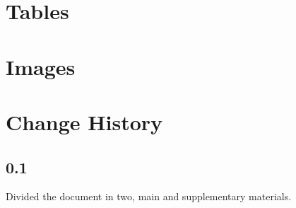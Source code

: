 \documentclass[10pt, a4paper, onecolumn]{article} %
\begin{document}
\listoffigures
\listoftables
\newpage


%

\section{Tables}














%

\section{Images}




\newpage

\section{Change History}

\subsection*{0.1}

Divided the document in two, main and supplementary materials.
\end{document}
